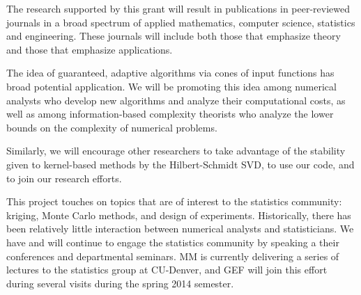 \documentclass[11pt]{NSFamsart}
\begin{document}
\begin{description}[leftmargin=2.5ex]
\item[Disseminating Research]
The research supported by this grant will result in publications in peer-reviewed journals in a broad spectrum of applied mathematics, computer science, statistics and engineering. These journals will include both those that emphasize theory and those that emphasize applications.

\item[Promoting Cones] The idea of guaranteed, adaptive algorithms via cones of input functions has broad potential application.  We will be promoting this idea among numerical analysts who develop new algorithms and analyze their computational costs, as well as among information-based complexity theorists who analyze the lower bounds on the complexity of numerical problems.

\item[Promoting the Hilbert-Schmidt SVD] Similarly, we will encourage other researchers to take advantage of the stability given to kernel-based methods by the Hilbert-Schmidt SVD, to use our code, and to join our research efforts.

\item[Bridging Mathematics and Statistics]
This project touches on topics that are of interest to the statistics community: kriging, Monte Carlo methods, and design of experiments.  Historically, there has been relatively little interaction between numerical analysts and statisticians.  We have and will continue to engage the statistics community by speaking a their conferences and departmental seminars.  MM is currently delivering a series of lectures to the statistics group at CU-Denver, and GEF will join this effort during several visits during the spring 2014 semester.


\end{description}
\end{document}
